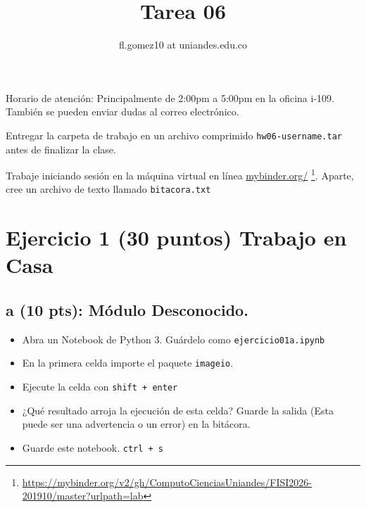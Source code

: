 \documentclass{article}
\title{Tarea 06}
\author{fl.gomez10 at uniandes.edu.co}
\begin{document}
\maketitle

Horario de atención: Principalmente de 2:00pm a 5:00pm en la oficina i-109. También se pueden enviar dudas al correo electrónico.

Entregar la carpeta de trabajo en un archivo comprimido \texttt{hw06-username.tar} antes de finalizar la clase. 

Trabaje iniciando  sesión en la máquina virtual en línea
\href{https://mybinder.org/v2/gh/ComputoCienciasUniandes/FISI2026-201910/master?urlpath=lab}{mybinder.org/}
\footnote{\url{https://mybinder.org/v2/gh/ComputoCienciasUniandes/FISI2026-201910/master?urlpath=lab}}. 
Aparte, cree un archivo de texto llamado \texttt{bitacora.txt}


\section*{Ejercicio 1 (30 puntos) Trabajo en Casa}
\subsection*{a (10 pts): Módulo Desconocido.}

\begin{itemize}
    \item Abra un Notebook de Python 3. Guárdelo como \texttt{ejercicio01a.ipynb}
    \item En la primera celda importe el paquete \texttt{imageio}.
    \item Ejecute la celda con \texttt{shift + enter}
    \item ¿Qué resultado arroja la ejecución de esta celda? Guarde la salida (Esta puede ser una advertencia o un error) en la bitácora.
    \item Guarde este notebook. \texttt{ctrl + s}
\end{itemize}
\end{document}
